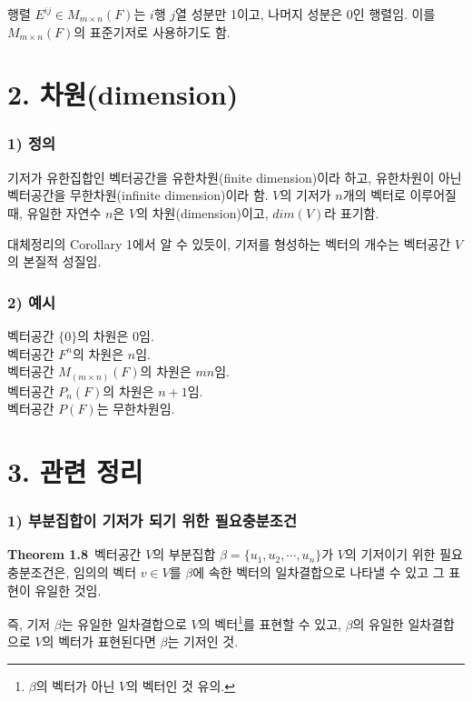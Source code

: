 행렬 $E^{ij} \in M_{m \times n}(F)$는 $i$행 $j$열 성분만 1이고, 나머지 성분은 0인 행렬임. 이를 $M_{m \times n}(F)$의 표준기저로 사용하기도 함.\\


\section*{2. 차원(dimension)}
\subsubsection*{1) 정의\\}
\begin{DEF}
기저가 유한집합인 벡터공간을 유한차원(finite dimension)이라 하고, 유한차원이 아닌 벡터공간을 무한차원(infinite dimension)이라 함. $V$의 기저가 $n$개의 벡터로 이루어질 때, 유일한 자연수 $n$은 $V$의 차원(dimension)이고, $dim(V)$라 표기함.
\end{DEF}

대체정리의 Corollary 1에서 알 수 있듯이, 기저를 형성하는 벡터의 개수는 벡터공간 $V$의 본질적 성질임.

\subsubsection*{2) 예시}
벡터공간 $\{0\}$의 차원은 0임.\\
벡터공간 $F^n$의 차원은 $n$임.\\
벡터공간 $M_(m \times n)(F)$의 차원은 $mn$임.\\
벡터공간 $P_n(F)$의 차원은 $n+1$임.\\
벡터공간 $P(F)$는 무한차원임.


\section*{3. 관련 정리}
\subsubsection*{1) 부분집합이 기저가 되기 위한 필요충분조건}
\textbf{Theorem 1.8}\, 벡터공간 $V$의 부분집합 $\beta = \{u_1,u_2, \cdots ,u_n\}$가 $V$의 기저이기 위한 필요충분조건은, 임의의 벡터 $v \in V$를 $\beta$에 속한 벡터의 일차결합으로 나타낼 수 있고 그 표현이 유일한 것임.

즉, 기저 $\beta$는 유일한 일차결합으로 $V$의 벡터\footnote{$\beta$의 벡터가 아닌 $V$의 벡터인 것 유의.}를 표현할 수 있고, $\beta$의 유일한 일차결합으로 $V$의 벡터가 표현된다면 $\beta$는 기저인 것.


